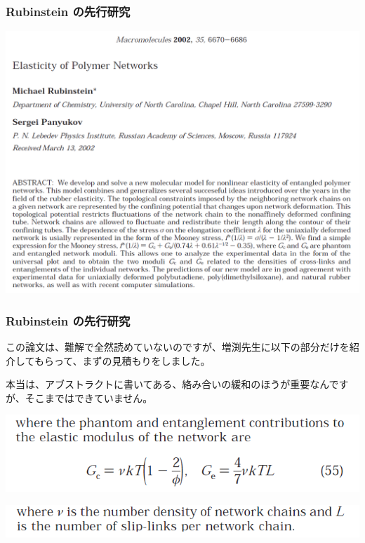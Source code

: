 \documentclass[12pt, dvipdfmx]{beamer}
\begin{document}
\begin{frame}
    \frametitle{Rubinstein の先行研究}
        \begin{center}
            \includegraphics[width=.8\textwidth]{./rubinstein_1.png}
        \end{center}
\end{frame}


\begin{frame}
    \frametitle{Rubinstein の先行研究}

        この論文は、難解で全然読めていないのですが、増渕先生に以下の部分だけを紹介してもらって、まずの見積もりをしました。

        本当は、アブストラクトに書いてある、絡み合いの緩和のほうが重要なんですが、そこまではできていません。

        \begin{center}
            \includegraphics[width=.8\textwidth]{./rubinstein_2.png}

            \includegraphics[width=.8\textwidth]{./rubinstein_3.png}
        \end{center}
\end{frame}
\end{document}
